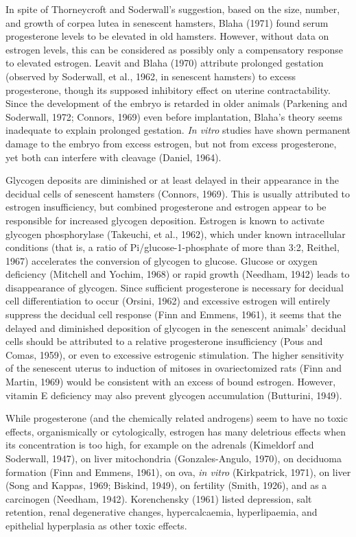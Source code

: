 In spite of Thorneycroft and Soderwall's suggestion, based on the size, number, and growth of corpea lutea in senescent hamsters, Blaha (1971) found serum progesterone levels to be elevated in old hamsters. However, without data on estrogen levels, this can be considered as possibly only a compensatory response to elevated estrogen. Leavit and Blaha (1970) attribute prolonged
gestation (observed by Soderwall, et al., 1962, in senescent hamsters) to excess progesterone, though its supposed inhibitory effect on uterine contractability. Since the development of the embryo is retarded in older animals (Parkening and Soderwall, 1972; Connors, 1969) even before implantation, Blaha's theory seems inadequate to explain prolonged gestation. \textit{In vitro} studies
have shown permanent damage to the embryo from excess estrogen, but not from excess progesterone, yet both can interfere with cleavage (Daniel, 1964).

Glycogen deposits are diminished or at least delayed in their appearance in the decidual cells of senescent hamsters (Connors, 1969). This is usually attributed to estrogen insufficiency, but combined progesterone and estrogen appear to be responsible for increased glycogen deposition. Estrogen is known to activate glycogen phosphorylase (Takeuchi, et al., 1962), which under known intracellular
conditions (that is, a ratio of Pi/glucose-1-phosphate of more than 3:2, Reithel, 1967) accelerates the conversion of glycogen to glucose. Glucose or oxygen deficiency (Mitchell and Yochim, 1968) or rapid growth (Needham, 1942) leads to disappearance of glycogen. Since sufficient progesterone is necessary for decidual cell differentiation to occur (Orsini, 1962) and excessive estrogen will
entirely suppress the decidual cell response (Finn and Emmens, 1961), it seems that the delayed and diminished deposition of glycogen in the senescent animals' decidual cells should be attributed to a relative progesterone insufficiency (Pous and Comas, 1959), or even to excessive estrogenic stimulation. The higher sensitivity of the senescent uterus
to induction of mitoses in ovariectomized rats (Finn and Martin, 1969) would be consistent with an excess of bound estrogen. However, vitamin E deficiency may also prevent glycogen accumulation (Butturini, 1949).

While progesterone (and the chemically related androgens) seem to have no toxic effects, organismically or cytologically, estrogen has many deletrious effects when its concentration is too high, for example on the adrenals (Kimeldorf and Soderwall, 1947), on liver mitochondria (Gonzales-Angulo, 1970), on deciduoma formation (Finn and Emmens, 1961), on ova, \textit{in vitro} (Kirkpatrick, 1971), on liver (Song and Kappas, 1969; Biskind, 1949), on
fertility (Smith, 1926), and as a carcinogen (Needham, 1942). Korenchensky (1961) listed depression, salt retention, renal degenerative changes, hypercalcaemia, hyperlipaemia, and epithelial hyperplasia as other toxic effects.

